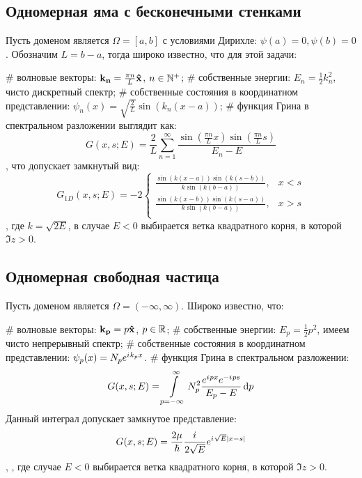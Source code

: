 \subsection{Одномерная яма с бесконечными стенками}
Пусть доменом является $\Omega = [a, b]$ с условиями Дирихле: $\psi(a) = 0, \psi(b) = 0$. Обозначим $L = b - a$, тогда широко известно, что для этой задачи:
\begin{ilist}
# волновые векторы: $\vb{k_n} = \frac{\pi n}{L} \vb{\hat{x}}$, $n \in \mathbb{N}^+$;
# собственные энергии: $E_n = \frac{1}{2} k_n^2$, чисто дискретный спектр;
# собственные состояния в координатном представлении: $\psi_n(x) = \sqrt{\frac{2}{L}} \sin(k_n (x - a))$;
# функция Грина в спектральном разложении выглядит как:
\[
G(x, s; E) = \frac{2}{L} \sum\limits_{n = 1}^\infty \frac{\sin(\frac{\pi n}{L} x) \sin(\frac{\pi n}{L} s)}{E_n - E}
\]
, что допускает замкнутый вид:
\[
G_{1D}(x, s; E) = - 2 \begin{cases}
\frac{\sin(k(x - a)) \sin(k(s - b))}{k \sin(k(b - a))}, & x < s \\
\frac{\sin(k(x - b)) \sin(k(s - a))}{k \sin(k(b - a))}, & x > s \\
\end{cases}
\]
, где $k = \sqrt{2 E}$, в случае $E < 0$ выбирается ветка квадратного корня, в которой $\Im z > 0$.
\end{ilist}

\subsection{Одномерная свободная частица}
Пусть доменом является $\Omega = (-\infty, \infty)$. Широко известно, что:
\begin{ilist}
# волновые векторы: $\vb{k_{p}} = p \vb{\hat{x}}$, $p \in \mathbb{R}$;
# собственные энергии: $E_p = \frac{1}{2} p^2$, имеем чисто непрерывный спектр;
# собственные состояния в координатном представлении: $\psi_p(x) = N_p e^{{i\mkern1mu} k_p x}$. 
# функция Грина в спектральном разложении:
\[
G(x, s; E) = \int\limits_{p = -\infty}^\infty N_p^2 \frac{e^{{i\mkern1mu} p x} e^{-{i\mkern1mu} p s}}{E_p - E} \dd{p}
\]
Данный интеграл допускает замкнутое представление:
\[
G(x, s; E) = \frac{2 \mu}{\hbar} \frac{{i\mkern1mu}}{2 \sqrt{E}} e^{{i\mkern1mu} \sqrt{E} |x - s|}
\],
, где случае $E < 0$ выбирается ветка квадратного корня, в которой $\Im z > 0$.
\end{ilist}

